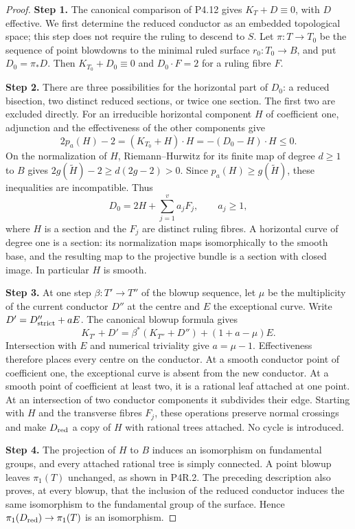\begin{proof}
\noindent\textbf{Step 1.} The canonical comparison of P4.12 gives
$K_T+D\equiv0$, with $D$ effective. We first determine the
reduced conductor as an embedded topological space; this
step does not require the ruling to descend to $S$.
Let $\pi:T\to T_0$ be the sequence of point blowdowns to
the minimal ruled surface $r_0:T_0\to B$, and put
$D_0=\pi_*D$. Then $K_{T_0}+D_0\equiv0$ and
$D_0\cdot F=2$ for a ruling fibre $F$.

\noindent\textbf{Step 2.} There are three possibilities for the horizontal part of
$D_0$: a reduced bisection, two distinct reduced sections,
or twice one section. The first two are excluded directly.
For an irreducible horizontal component $H$ of coefficient
one, adjunction and the effectiveness of the other
components give
\[
 2p_a(H)-2=(K_{T_0}+H)\cdot H
       =-(D_0-H)\cdot H\le0.
\]
On the normalization of $H$, Riemann--Hurwitz for its
finite map of degree $d\ge1$ to $B$ gives
$2g(\widetilde H)-2\ge d(2g-2)>0$.
Since $p_a(H)\ge g(\widetilde H)$, these inequalities
are incompatible. Thus
\[
 D_0=2H+\sum_{j=1}^{v}a_jF_j,\qquad a_j\ge1,
\]
where $H$ is a section and the $F_j$ are distinct ruling
fibres. A horizontal curve of degree one is a section:
its normalization maps isomorphically to the smooth base,
and the resulting map to the projective bundle is a
section with closed image. In particular $H$ is smooth.

\noindent\textbf{Step 3.} At one step $\beta:T'\to T''$ of the blowup sequence,
let $\mu$ be the multiplicity of the current conductor
$D''$ at the centre and $E$ the exceptional curve.
Write $D'=D''_{\rm strict}+aE$. The canonical blowup
formula gives
\[
 K_{T'}+D'
   =\beta^*(K_{T''}+D'')+(1+a-\mu)E.
\]
Intersection with $E$ and numerical triviality give
$a=\mu-1$. Effectiveness therefore places every centre
on the conductor. At a smooth conductor point of
coefficient one, the exceptional curve is absent from
the new conductor. At a smooth point of coefficient at
least two, it is a rational leaf attached at one point.
At an intersection of two conductor components it
subdivides their edge. Starting with $H$ and the
transverse fibres $F_j$, these operations preserve
normal crossings and make $D_{\rm red}$ a copy of $H$
with rational trees attached. No cycle is introduced.

\noindent\textbf{Step 4.} The projection of $H$ to $B$ induces an isomorphism on
fundamental groups, and every attached rational tree
is simply connected. A point blowup leaves
$\pi_1(T)$ unchanged, as shown in P4R.2. The preceding
description also proves, at every blowup, that the
inclusion of the reduced conductor induces the same
isomorphism to the fundamental group of the surface.
Hence $\pi_1(D_{\rm red})\to\pi_1(T)$ is an
isomorphism.


\end{proof}
